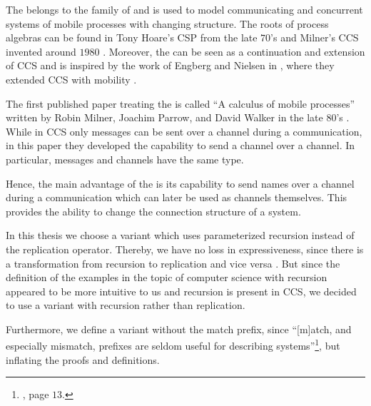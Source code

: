 The \findex[\picalc{}|(]{\picalc{}} belongs to the family of  and is used to model communicating and concurrent systems of mobile processes with changing structure. The roots of process algebras can be found in Tony Hoare's \gls{CSP} from the late $70$'s and Milner's \gls{CCS} invented around $1980$ \cite{milnerCCS}. Moreover, the \picalc{} can be seen as a continuation and extension of \gls{CCS} and is inspired by the work of Engberg and Nielsen in \cite{engbertNielsen}, where they extended \gls{CCS} with mobility \cite{milnerParrowWalker}. 

The first published paper treating the \picalc{} is called ``A calculus of mobile processes'' \cite{milnerParrowWalker} written by Robin Milner, Joachim Parrow, and David Walker in the late $80$'s \cite{milner}. While in \gls{CCS} only messages can be sent over a channel during a communication, in this paper they developed the capability to send a channel over a channel. In particular, messages and channels have the same type.%

Hence, the main advantage of the \picalc{} is its capability to send names over a channel during a communication which can later be used as channels themselves. This provides the ability to change the connection structure of a system.

In this thesis we choose a \picalc{} variant which uses parameterized recursion instead of the replication operator. Thereby, we have no loss in expressiveness, since there is a transformation from recursion to replication and vice versa \cite{milner,sangiorgi}. But since the definition of the examples in the topic of computer science with recursion appeared to be more intuitive to us and recursion is present in \gls{CCS}, we decided to use a variant with recursion rather than replication.%

Furthermore, we define a variant without the match prefix, since ``[m]atch, and especially mismatch, prefixes are seldom useful for describing systems''\footnote{\cite{sangiorgi}, page $13$.}, but inflating the proofs and definitions.

